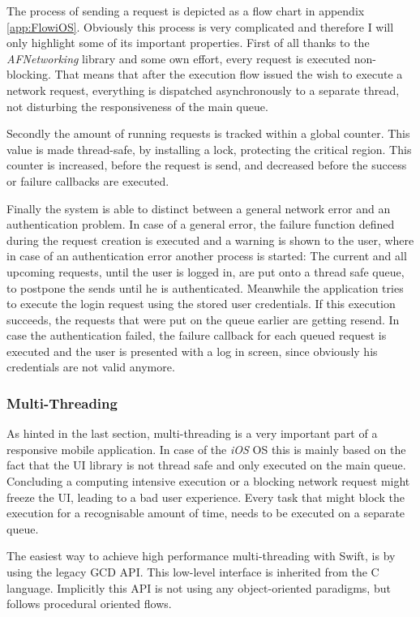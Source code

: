The process of sending a request is depicted as a flow chart in appendix \vref{app:FlowiOS}. Obviously this process is very complicated and therefore I will only highlight some of its important properties. First of all thanks to the \emph{AFNetworking} library and some own effort, every request is executed non-blocking. That means that after the execution flow issued the wish to execute a network request, everything is dispatched asynchronously to a  separate thread, not disturbing the responsiveness of the main queue.

Secondly the amount of running requests is tracked within a global counter. This value is made thread-safe, by installing a lock, protecting the critical region. This counter is increased, before the request is send, and decreased before the success or failure callbacks are executed.

Finally the system is able to distinct between a general network error and an authentication problem. In case of a general error, the failure function defined during the request creation is executed and a warning is shown to the user, where in case of an authentication error another process is started: The current and all upcoming requests, until the user is logged in, are put onto a thread safe queue, to postpone the sends until he is authenticated. Meanwhile the application tries to execute the login request using the stored user credentials. If this execution succeeds, the requests that were put on the queue earlier are getting resend. In case the authentication failed, the failure callback for each queued request is executed and the user is presented with a log in screen, since obviously his credentials are not valid anymore. 

\subsubsection{Multi-Threading}

As hinted in the last section, multi-threading is a very important part of a responsive mobile application. In case of the \emph{iOS} \acrlong{OS} this is mainly based on the fact that the \gls{UI} library is not thread safe and only executed on the main queue. Concluding a computing intensive execution or a blocking network request might freeze the \gls{UI}, leading to a bad user experience. Every task that might block the execution for a recognisable amount of time, needs to be executed on a separate queue.

The easiest way to achieve high performance multi-threading with \gls{Swift}, is by using the legacy \gls{GCD} \gls{API}. This low-level interface is inherited from the C language. Implicitly this \gls{API} is not using any object-oriented paradigms, but follows procedural oriented flows. 

